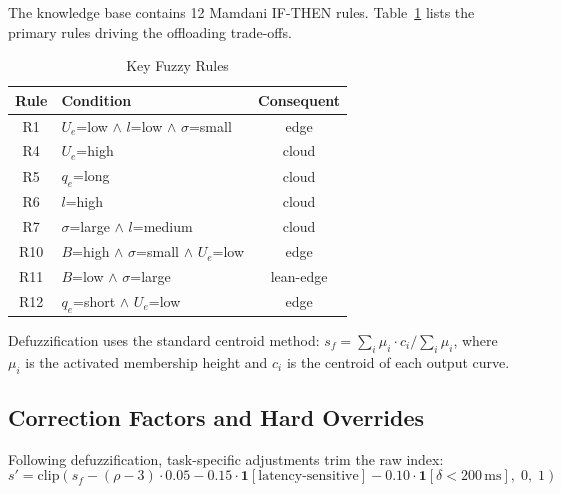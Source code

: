 \documentclass[conference]{IEEEtran}
\begin{document}
The knowledge base contains 12 Mamdani IF-THEN rules. Table~\ref{tab:rules} lists the primary rules driving the offloading trade-offs.

\begin{table}[h]
\centering
\caption{Key Fuzzy Rules}
\label{tab:rules}
\begin{tabular}{clc}
\toprule
\textbf{Rule} & \textbf{Condition} & \textbf{Consequent} \\
\midrule
R1 & $U_e$=low $\wedge$ $l$=low $\wedge$ $\sigma$=small & edge \\
R4 & $U_e$=high                                         & cloud \\
R5 & $q_e$=long                                        & cloud \\
R6 & $l$=high                                           & cloud \\
R7 & $\sigma$=large $\wedge$ $l$=medium                & cloud \\
R10 & $B$=high $\wedge$ $\sigma$=small $\wedge$ $U_e$=low & edge \\
R11 & $B$=low $\wedge$ $\sigma$=large                  & lean-edge \\
R12 & $q_e$=short $\wedge$ $U_e$=low                   & edge \\
\bottomrule
\end{tabular}
\end{table}

Defuzzification uses the standard centroid method:
$s_f = {\sum_i \mu_i \cdot c_i} / {\sum_i \mu_i}$,
where $\mu_i$ is the activated membership height and $c_i$ is the centroid of each output curve.

\subsection{Correction Factors and Hard Overrides}
Following defuzzification, task-specific adjustments trim the raw index:
\begin{equation}
  s' = \mathrm{clip}\!\left(
    s_f
    - (\rho-3)\cdot 0.05
    - 0.15\cdot\mathbf{1}[\text{latency-sensitive}]
    - 0.10\cdot\mathbf{1}[\delta < 200\,\text{ms}]
  ,\; 0,\; 1\right)
  \label{eq:correction}
\end{equation}
\end{document}
